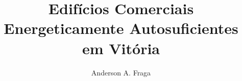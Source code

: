 \documentclass[a4paper, 12pt]{article}
\begin{document}
\title{Edifícios Comerciais Energeticamente Autosuficientes em Vitória}
\author{Anderson A. Fraga}
\maketitle

%


%
\end{document}
